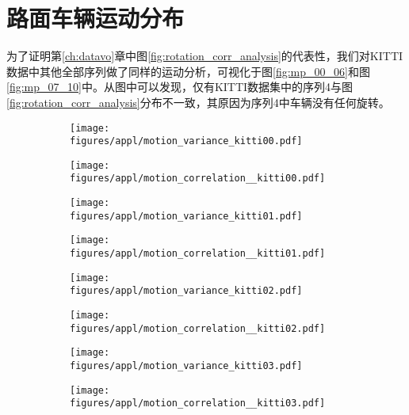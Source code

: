 \chapter{路面车辆运动分布}
\label{ch:app_motion_dis}
为了证明第\ref{ch:datavo}章中图\ref{fig:rotation_corr_analysis}的代表性，我们对KITTI数据中其他全部序列做了同样的运动分析，可视化于图\ref{fig:mp_00_06}和图\ref{fig:mp_07_10}中。从图中可以发现，仅有KITTI数据集中的序列4与图\ref{fig:rotation_corr_analysis}分布不一致，其原因为序列4中车辆没有任何旋转。

\begin{figure}[h]
    \centering
        \begin{subfigure}[b]{0.48\textwidth}
            \texttt{[image: figures/appl/motion\_variance\_kitti00.pdf]}
        \end{subfigure}
        \begin{subfigure}[b]{0.48\textwidth}
            \texttt{[image: figures/appl/motion\_correlation\_\_kitti00.pdf]}
        \end{subfigure}
        \begin{subfigure}[b]{0.48\textwidth}
            \texttt{[image: figures/appl/motion\_variance\_kitti01.pdf]}
        \end{subfigure}
        \begin{subfigure}[b]{0.48\textwidth}
            \texttt{[image: figures/appl/motion\_correlation\_\_kitti01.pdf]}
        \end{subfigure}
        \begin{subfigure}[b]{0.48\textwidth}
            \texttt{[image: figures/appl/motion\_variance\_kitti02.pdf]}
        \end{subfigure}
        \begin{subfigure}[b]{0.48\textwidth}
            \texttt{[image: figures/appl/motion\_correlation\_\_kitti02.pdf]}
        \end{subfigure}
        \begin{subfigure}[b]{0.48\textwidth}
            \texttt{[image: figures/appl/motion\_variance\_kitti03.pdf]}
        \end{subfigure}
        \begin{subfigure}[b]{0.48\textwidth}
            \texttt{[image: figures/appl/motion\_correlation\_\_kitti03.pdf]}
        \end{subfigure}
        \begin{subfigure}[b]{0.48\textwidth}

\end{subfigure}
\end{figure}
